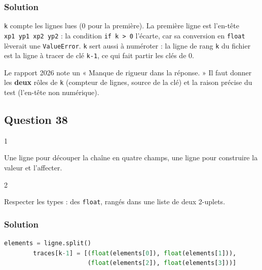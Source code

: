 \documentclass[11pt,a4paper]{article}
\begin{document}
\hypertarget{solution-36}{%
\subsubsection{Solution}\label{solution-36}}

\texttt{k} compte les lignes lues (0 pour la première). La première ligne est l'en-tête \texttt{xp1\ yp1\ xp2\ yp2} : la condition \texttt{if\ k\ \textgreater{}\ 0} l'écarte, car sa conversion en \texttt{float} lèverait une \texttt{ValueError}. \texttt{k} sert aussi à numéroter : la ligne de rang \texttt{k} du fichier est la ligne à tracer de clé \texttt{k-1}, ce qui fait partir les clés de 0.

\begin{jury}

Le rapport 2026 note un « Manque de rigueur dans la réponse. » Il faut donner les \textbf{deux} rôles de \texttt{k} (compteur de lignes, source de la clé) et la raison précise du test (l'en-tête non numérique).

\end{jury}

\hypertarget{question-38}{%
\subsection{Question 38}\label{question-38}}

\begin{indication}{1}

Une ligne pour découper la chaîne en quatre champs, une ligne pour construire la valeur et l'affecter.

\end{indication}

\begin{indication}{2}

Respecter les types : des \texttt{float}, rangés dans une liste de deux 2-uplets.

\end{indication}

\hypertarget{solution-37}{%
\subsubsection{Solution}\label{solution-37}}

\begin{lstlisting}[language=Python]
        elements = ligne.split()
        traces[k-1] = [(float(elements[0]), float(elements[1])),
                       (float(elements[2]), float(elements[3]))]
\end{lstlisting}
\end{document}
